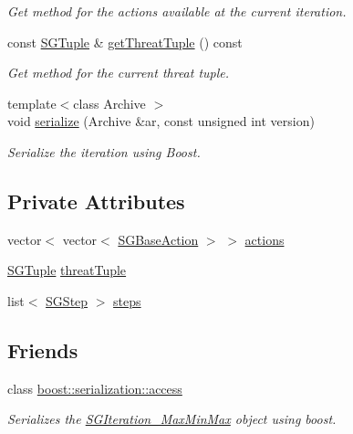 \begin{DoxyCompactItemize}
\begin{DoxyCompactList}\small\item\em Get method for the actions available at the current iteration. \end{DoxyCompactList}\item 
\mbox{\label{classSGIteration__MaxMinMax_aca2ec19eb2806af69fdd7c7121794d04}} 
const \hyperlink{classSGTuple}{S\+G\+Tuple} \& \hyperlink{classSGIteration__MaxMinMax_aca2ec19eb2806af69fdd7c7121794d04}{get\+Threat\+Tuple} () const
\begin{DoxyCompactList}\small\item\em Get method for the current threat tuple. \end{DoxyCompactList}\item 
\mbox{\label{classSGIteration__MaxMinMax_ae5590462f3a8b5b378a7ee35ffb8fcb0}} 
{\footnotesize template$<$class Archive $>$ }\\void \hyperlink{classSGIteration__MaxMinMax_ae5590462f3a8b5b378a7ee35ffb8fcb0}{serialize} (Archive \&ar, const unsigned int version)
\begin{DoxyCompactList}\small\item\em Serialize the iteration using Boost. \end{DoxyCompactList}\end{DoxyCompactItemize}
\subsection*{Private Attributes}
\begin{DoxyCompactItemize}
\item 
vector$<$ vector$<$ \hyperlink{classSGBaseAction}{S\+G\+Base\+Action} $>$ $>$ \hyperlink{classSGIteration__MaxMinMax_a0f6a9b1c5590ba858e154f365c09b472}{actions}
\item 
\hyperlink{classSGTuple}{S\+G\+Tuple} \hyperlink{classSGIteration__MaxMinMax_a095e196445f8ade3f0da2715b2337cae}{threat\+Tuple}
\item 
list$<$ \hyperlink{classSGStep}{S\+G\+Step} $>$ \hyperlink{classSGIteration__MaxMinMax_aba082a06c4a9bf9c1f1dcc70ae159838}{steps}
\end{DoxyCompactItemize}
\subsection*{Friends}
\begin{DoxyCompactItemize}
\item 
\mbox{\label{classSGIteration__MaxMinMax_ac98d07dd8f7b70e16ccb9a01abf56b9c}} 
class \hyperlink{classSGIteration__MaxMinMax_ac98d07dd8f7b70e16ccb9a01abf56b9c}{boost\+::serialization\+::access}
\begin{DoxyCompactList}\small\item\em Serializes the \hyperlink{classSGIteration__MaxMinMax}{S\+G\+Iteration\+\_\+\+Max\+Min\+Max} object using boost. \end{DoxyCompactList}\end{DoxyCompactItemize}


